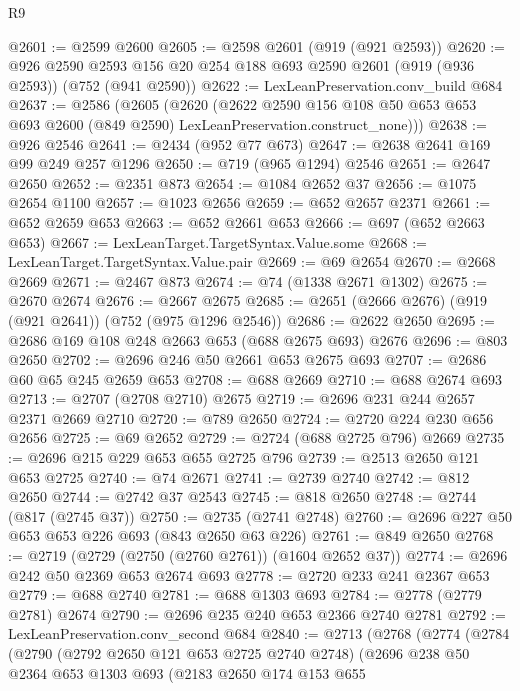\begin{lexlean}{R9}
\begin{coremodule}
@2601 := @2599 @2600
@2605 := @2598 @2601 (@919 (@921 @2593))
@2620 := @926
    @2590
    @2593
    @156
    @20
    @254
    @188
    @693
    @2590
    @2601
    (@919 (@936 @2593))
    (@752 (@941 @2590))
@2622 := LexLeanPreservation.conv_build @684
@2637 := @2586
    (@2605
      (@2620
        (@2622
          @2590
          @156
          @108
          @50
          @653
          @653
          @693
          @2600
          (@849 @2590)
          LexLeanPreservation.construct_none)))
@2638 := @926 @2546
@2641 := @2434 (@952 @77 @673)
@2647 := @2638 @2641 @169 @99 @249 @257 @1296
@2650 := @719 (@965 @1294) @2546
@2651 := @2647 @2650
@2652 := @2351 @873
@2654 := @1084 @2652 @37
@2656 := @1075 @2654 @1100
@2657 := @1023 @2656
@2659 := @652 @2657 @2371
@2661 := @652 @2659 @653
@2663 := @652 @2661 @653
@2666 := @697 (@652 @2663 @653)
@2667 := LexLeanTarget.TargetSyntax.Value.some
@2668 := LexLeanTarget.TargetSyntax.Value.pair
@2669 := @69 @2654
@2670 := @2668 @2669
@2671 := @2467 @873
@2674 := @74 (@1338 @2671 @1302)
@2675 := @2670 @2674
@2676 := @2667 @2675
@2685 := @2651 (@2666 @2676) (@919 (@921 @2641)) (@752 (@975 @1296 @2546))
@2686 := @2622 @2650
@2695 := @2686 @169 @108 @248 @2663 @653 (@688 @2675 @693) @2676
@2696 := @803 @2650
@2702 := @2696 @246 @50 @2661 @653 @2675 @693
@2707 := @2686 @60 @65 @245 @2659 @653
@2708 := @688 @2669
@2710 := @688 @2674 @693
@2713 := @2707 (@2708 @2710) @2675
@2719 := @2696 @231 @244 @2657 @2371 @2669 @2710
@2720 := @789 @2650
@2724 := @2720 @224 @230 @656 @2656
@2725 := @69 @2652
@2729 := @2724 (@688 @2725 @796) @2669
@2735 := @2696 @215 @229 @653 @655 @2725 @796
@2739 := @2513 @2650 @121 @653 @2725
@2740 := @74 @2671
@2741 := @2739 @2740
@2742 := @812 @2650
@2744 := @2742 @37 @2543
@2745 := @818 @2650
@2748 := @2744 (@817 (@2745 @37))
@2750 := @2735 (@2741 @2748)
@2760 := @2696 @227 @50 @653 @653 @226 @693 (@843 @2650 @63 @226)
@2761 := @849 @2650
@2768 := @2719 (@2729 (@2750 (@2760 @2761)) (@1604 @2652 @37))
@2774 := @2696 @242 @50 @2369 @653 @2674 @693
@2778 := @2720 @233 @241 @2367 @653
@2779 := @688 @2740
@2781 := @688 @1303 @693
@2784 := @2778 (@2779 @2781) @2674
@2790 := @2696 @235 @240 @653 @2366 @2740 @2781
@2792 := LexLeanPreservation.conv_second @684
@2840 := @2713
    (@2768
      (@2774
        (@2784
          (@2790
            (@2792 @2650 @121 @653 @2725 @2740 @2748)
            (@2696
              @238
              @50
              @2364
              @653
              @1303
              @693
              (@2183
                @2650
                @174
                @153
                @655

\end{coremodule}
\end{lexlean}
